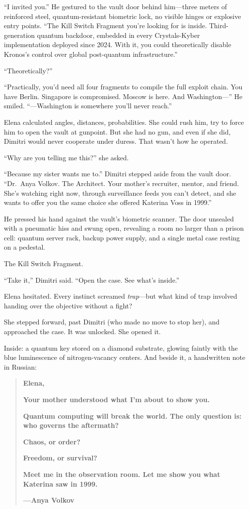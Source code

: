 \documentclass[12pt,letterpaper]{book}
\begin{document}
``I invited you.'' He gestured to the vault door behind him---three meters of reinforced steel, quantum-resistant biometric lock, no visible hinges or explosive entry points. ``The Kill Switch Fragment you're looking for is inside. Third-generation quantum backdoor, embedded in every Crystals-Kyber implementation deployed since 2024. With it, you could theoretically disable Kronos's control over global post-quantum infrastructure.''

``Theoretically?''

``Practically, you'd need all four fragments to compile the full exploit chain. You have Berlin. Singapore is compromised. Moscow is here. And Washington---'' He smiled. ``---Washington is somewhere you'll never reach.''

Elena calculated angles, distances, probabilities. She could rush him, try to force him to open the vault at gunpoint. But she had no gun, and even if she did, Dimitri would never cooperate under duress. That wasn't how he operated.

``Why are you telling me this?'' she asked.

``Because my sister wants me to.'' Dimitri stepped aside from the vault door. ``Dr.~Anya Volkov. The Architect. Your mother's recruiter, mentor, and friend. She's watching right now, through surveillance feeds you can't detect, and she wants to offer you the same choice she offered Katerina Voss in 1999.''

He pressed his hand against the vault's biometric scanner. The door unsealed with a pneumatic hiss and swung open, revealing a room no larger than a prison cell: quantum server rack, backup power supply, and a single metal case resting on a pedestal.

The Kill Switch Fragment.

``Take it,'' Dimitri said. ``Open the case. See what's inside.''

Elena hesitated. Every instinct screamed \emph{trap}---but what kind of trap involved handing over the objective without a fight?

She stepped forward, past Dimitri (who made no move to stop her), and approached the case. It was unlocked. She opened it.

Inside: a quantum key stored on a diamond substrate, glowing faintly with the blue luminescence of nitrogen-vacancy centers. And beside it, a handwritten note in Russian:

\begin{quote}
\textbf{Elena,}

\textbf{Your mother understood what I'm about to show you.}

\textbf{Quantum computing will break the world. The only question is: who governs the aftermath?}

\textbf{Chaos, or order?}

\textbf{Freedom, or survival?}

\textbf{Meet me in the observation room. Let me show you what Katerina saw in 1999.}

\textbf{---Anya Volkov}
\end{quote}
\end{document}
